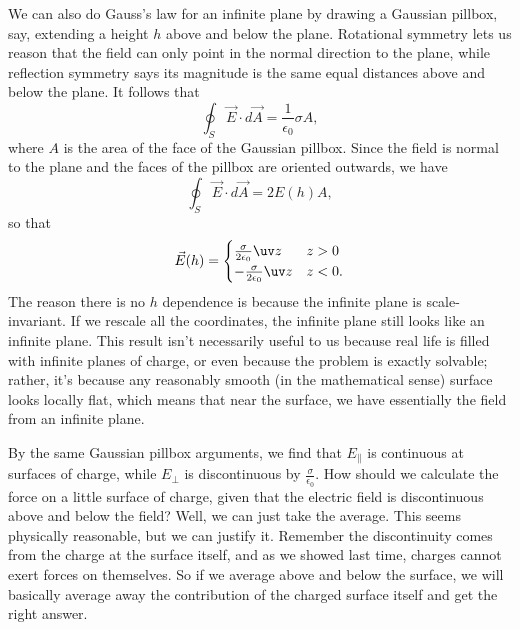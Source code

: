We can also do Gauss's law for an infinite plane by drawing a Gaussian pillbox, say, extending a height $h$ above and below the plane. Rotational symmetry lets us reason that the field can only point in the normal direction to the plane, while reflection symmetry says its magnitude is the same equal distances above and below the plane. It follows that
\begin{equation}
    \oint_S \vec E \cdot d \vec A = \frac{1}{\epsilon_0} \sigma A,
\end{equation}
where $A$ is the area of the face of the Gaussian pillbox. Since the field is normal to the plane and the faces of the pillbox are oriented outwards, we have
\begin{equation}
    \oint_S \vec E \cdot d\vec A = 2 E(h) A,
\end{equation}
so that
\begin{equation}
    \vec{E}(h) =\begin{cases}
        \frac{\sigma}{2\epsilon_0}\uv z & z >0\\
        -\frac{\sigma}{2\epsilon_0} \uv z & z < 0.
    \end{cases}
\end{equation}
The reason there is no $h$ dependence is because the infinite plane is scale-invariant. If we rescale all the coordinates, the infinite plane still looks like an infinite plane. This result isn't necessarily useful to us because real life is filled with infinite planes of charge, or even because the problem is exactly solvable; rather, it's because any reasonably smooth (in the mathematical sense) surface looks locally flat, which means that near the surface, we have essentially the field from an infinite plane. 

By the same Gaussian pillbox arguments, we find that $E_\parallel$ is continuous at surfaces of charge, while $E_\perp$ is discontinuous by $\frac{\sigma}{\epsilon_0}$.
How should we calculate the force on a little surface of charge, given that the electric field is discontinuous above and below the field? Well, we can just take the average. This seems physically reasonable, but we can justify it. Remember the discontinuity comes from the charge at the surface itself, and as we showed last time, charges cannot exert forces on themselves. So if we average above and below the surface, we will basically average away the contribution of the charged surface itself and get the right answer.

